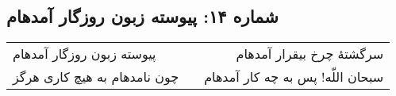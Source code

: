 \begin{center}
\section*{شماره ۱۴: پیوسته زبون روزگار آمدهام}
\label{sec:014}
\begin{longtable}{l p{0.5cm} r}
پیوسته زبون روزگار آمدهام
&&
سرگشتهٔ چرخ بیقرار آمدهام
\\
چون نامدهام به هیچ کاری هرگز
&&
سبحان اللّه! پس به چه کار آمدهام
\\
\end{longtable}
\end{center}
